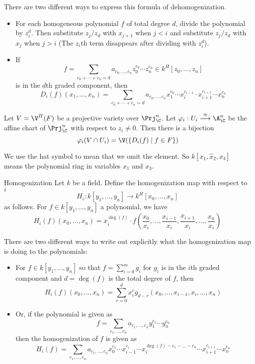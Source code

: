 \documentclass[a4paper]{article}
\begin{document}
There are two different ways to express this formula of dehomogenization. 
\begin{itemize}
\item For each homogeneous polynomial $f$ of total degree $d$, divide the polynomial by $z_i^d$. Then substitute $z_j/z_d$ with $x_{j+1}$ when $j<i$ and substitute $z_j/z_d$ with $x_j$ when $j>i$ (The $z_i$th term disappears after dividing with $z_i^d$). 
\item If $$f=\sum_{c_0+\cdots+c_n=d} a_{c_0,\dots,c_n}z_0^{c_0}\cdots z_n^{c_n}\in k^H[z_0,\dots,z_n]$$ is in the $d$th graded component, then $$D_i(f)(x_1,\dots,x_n)=\sum_{c_0+\cdots+c_n=d} a_{c_0,\dots,c_n}x_1^{c_0}\cdots x_i^{c_{i-1}}\cdot x_{i+1}^{c_{i+1}}\cdots x_n^{c_n}$$
\end{itemize}

\begin{prp}{}{} Let $V=\V^H(F)$ be a projective variety over $\Prj_\C^n$. Let $\varphi_i:U_i\overset{\cong}{\longrightarrow}\A_\C^n$ be the affine chart of $\Prj_\C^n$ with respect to $z_i\neq 0$. Then there is a bijection $$\varphi_i(V\cap U_i)=\V(\{D_i(f)\;|\;f\in F\})$$
\end{prp}

We use the hat symbol to mean that we omit the element. So $k[x_1,\hat{x}_2,x_3]$ means the polynomial ring in variables $x_1$ and $x_3$. 

\begin{defn}{Homogenization}{} Let $k$ be a field. Define the homogenization map with respect to $i$ $$H_i:k[y_1,\dots,y_n]\to k^H[x_0,\dots,x_n]$$ as follows. For $f\in k[y_1,\dots,y_n]$ a polynomial, we have $$H_i(f)(x_0,\dots,x_n)=x_i^{\deg(f)}\cdot f\left(\frac{x_0}{x_i},\dots,\frac{x_{i-1}}{x_i},\frac{x_{i+1}}{x_i},\dots,\frac{x_n}{x_i}\right)$$
\end{defn}

There are two different ways to write out explicitly what the homogenization map is doing to the polynomials: 
\begin{itemize}
\item For $f\in k[y_1,\dots,y_n]$ so that $f=\sum_{i=0}^mg_i$ for $g_i$ is in the $i$th graded component and $d=\deg(f)$ is the total degree of $f$, then $$H_i(f)(x_0,\dots,x_n)=\sum_{r=0}^dx_i^rg_{d-r}(x_0,\dots,x_{i-1},x_i,\dots,x_n)$$ 
\item Or, if the polynomial is given as $$f=\sum_{c_1,\dots,c_n}a_{c_1,\dots,c_n}y_1^{c_1}\cdots y_n^{c_n}$$ then the homogenization of $f$ is given as $$H_i(f)=\sum_{c_1,\dots,c_n}a_{c_1,\dots,c_n}x_0^{c_1}\cdots x_{i-1}^{c_i}\cdots x_i^{\deg(f)-c_1-\dots-c_n}\cdots x_{i+1}^{c_{i+1}}\cdots x_n^{c_n}$$
\end{itemize}
\end{document}
